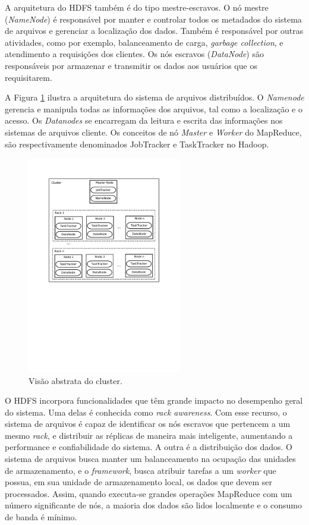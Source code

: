 A arquitetura do HDFS também é do tipo mestre-escravos.
O nó mestre (\textit{NameNode}) é responsável por manter e controlar todos os metadados do sistema de arquivos e gerenciar a localização dos dados. Também é responsável por outras atividades, como por exemplo, balanceamento de carga, \textit{garbage collection}, e atendimento a requisições dos clientes.
Os nós escravos (\textit{DataNode}) são responsáveis por armazenar e transmitir os dados aos usuários que os requisitarem.

A Figura \ref{fig:hdfs} ilustra a arquitetura do sistema de arquivos distribuídos.
O \textit{Namenode} gerencia e manipula todas as informações dos arquivos, tal como a localização e o acesso. Os \textit{Datanodes} se encarregam da leitura e escrita das informações nos sistemas de arquivos cliente. Os conceitos de nó \textit{Master} e \textit{Worker} do MapReduce, são respectivamente denominados JobTracker e TaskTracker no Hadoop.
\begin{figure}[htb]
\centering
\includegraphics[trim=0cm 6cm 0cm 2cm, width=0.6\textwidth]{figuras/HadoopCluster.pdf}
\caption{Visão abstrata do cluster.}
\label{fig:hdfs}
\end{figure}

O HDFS incorpora funcionalidades que têm grande impacto no desempenho geral do sistema.
Uma delas é conhecida como \textit{rack awareness}. Com esse recurso, o sistema de arquivos é capaz de identificar os nós escravos que pertencem a um mesmo \textit{rack}, e distribuir as réplicas de maneira mais inteligente, aumentando a performance e confiabilidade do sistema.
A outra é a distribuição dos dados. O sistema de arquivos busca manter um balanceamento na ocupação das unidades de armazenamento, e o \textit{framework}, busca atribuir tarefas a um \textit{worker} que possua, em sua unidade de armazenamento local, os dados que devem ser processados.
Assim, quando executa-se grandes operações MapReduce com um número significante de nós, a maioria dos dados são lidos localmente e o consumo de banda é mínimo.





